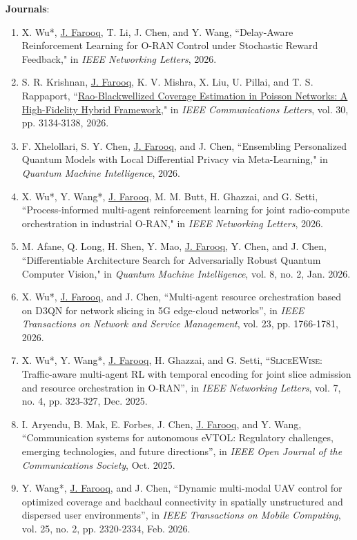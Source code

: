 \documentclass[letterpaper,11pt]{article}
\newcommand{\resumeItem}[2]{
  \item\small{
    \textbf{#1}{: #2 \vspace{-2pt}}
  }
}
\newcommand{\resumeSubItem}[2]{\resumeItem{#1}{#2}\vspace{-4pt}}
\begin{document}
  \resumeSubItem{Journals}{}
      \justifying
      \begin{enumerate}
      \item[\rm{[J24]}] X. Wu*, \underline{J. Farooq}, T. Li, J. Chen, and Y. Wang, ``Delay-Aware Reinforcement Learning for O-RAN Control under Stochastic Reward Feedback," in \emph{IEEE Networking Letters}, 2026.
      \item[\rm{[J23]}] S. R. Krishnan, \underline{J. Farooq}, K. V. Mishra, X. Liu, U. Pillai, and T. S. Rappaport, ``\href{https://ieeexplore.ieee.org/document/11677140}{Rao-Blackwellized Coverage Estimation in Poisson Networks: A High-Fidelity Hybrid Framework}," in \emph{IEEE Communications Letters}, vol. 30, pp. 3134-3138, 2026.
      \item[\rm{[J22]}] F. Xhelollari, S. Y. Chen, \underline{J. Farooq}, and J. Chen, ``Ensembling Personalized Quantum Models with Local Differential Privacy via Meta-Learning," in \emph{Quantum Machine Intelligence}, 2026.
      \item[\rm{[J21]}] X. Wu*, Y. Wang*, \underline{J. Farooq}, M. M. Butt, H. Ghazzai, and G. Setti, ``Process-informed multi-agent reinforcement learning for joint radio-compute orchestration in industrial O-RAN," in \emph{IEEE Networking Letters}, 2026.
      \item[\rm{[J20]}] M. Afane, Q. Long, H. Shen, Y. Mao, \underline{J. Farooq}, Y. Chen, and J. Chen, ``Differentiable Architecture Search for Adversarially Robust Quantum Computer Vision," in \emph{Quantum Machine Intelligence},  vol. 8, no. 2, Jan. 2026.
        \item[\rm{[J19]}] X. Wu*, \underline{J. Farooq}, and J. Chen, ``Multi-agent resource orchestration based on D3QN for network slicing in 5G edge-cloud networks'', in \textit{IEEE Transactions on Network and Service Management}, vol. 23, pp. 1766-1781, 2026.
        \item[\rm{[J18]}] X. Wu*, Y. Wang*, \underline{J. Farooq}, H. Ghazzai, and G. Setti, ``\textsc{SliceEWise}: Traffic-aware multi-agent RL with temporal encoding for joint slice admission and resource orchestration in O-RAN'', in \emph{IEEE Networking Letters}, vol. 7, no. 4, pp. 323-327, Dec. 2025.
        \item[\rm{[J17]}] I. Aryendu, B. Mak, E. Forbes, J. Chen, \underline{J. Farooq}, and Y. Wang, ``Communication systems for autonomous eVTOL: Regulatory challenges, emerging technologies, and future directions'', in \textit{IEEE Open Journal of the Communications Society}, Oct. 2025.
        \item[\rm{[J16]}] Y. Wang*, \underline{J. Farooq}, and J. Chen, ``Dynamic multi-modal UAV control for optimized coverage and backhaul connectivity in spatially unstructured and dispersed user environments'', in \textit{IEEE Transactions on Mobile Computing}, vol. 25, no. 2, pp. 2320-2334, Feb. 2026.

\end{enumerate}
\end{document}
